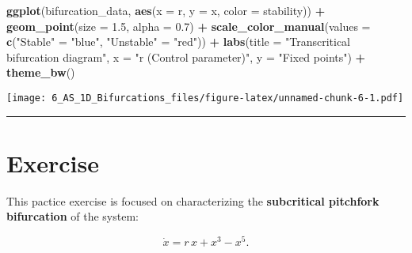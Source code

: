 \documentclass[
]{article}
\newenvironment{Shaded}{\begin{snugshade}}{\end{snugshade}}
\newcommand{\AttributeTok}[1]{\textcolor[rgb]{0.13,0.29,0.53}{#1}}
\newcommand{\FloatTok}[1]{\textcolor[rgb]{0.00,0.00,0.81}{#1}}
\newcommand{\FunctionTok}[1]{\textcolor[rgb]{0.13,0.29,0.53}{\textbf{#1}}}
\newcommand{\NormalTok}[1]{#1}
\newcommand{\OtherTok}[1]{\textcolor[rgb]{0.56,0.35,0.01}{#1}}
\newcommand{\SpecialCharTok}[1]{\textcolor[rgb]{0.81,0.36,0.00}{\textbf{#1}}}
\newcommand{\StringTok}[1]{\textcolor[rgb]{0.31,0.60,0.02}{#1}}
\begin{document}
\begin{Shaded}
\begin{Highlighting}[]
\FunctionTok{ggplot}\NormalTok{(bifurcation\_data, }\FunctionTok{aes}\NormalTok{(}\AttributeTok{x =}\NormalTok{ r, }\AttributeTok{y =}\NormalTok{ x, }\AttributeTok{color =}\NormalTok{ stability)) }\SpecialCharTok{+}
  \FunctionTok{geom\_point}\NormalTok{(}\AttributeTok{size =} \FloatTok{1.5}\NormalTok{, }\AttributeTok{alpha =} \FloatTok{0.7}\NormalTok{) }\SpecialCharTok{+}
  \FunctionTok{scale\_color\_manual}\NormalTok{(}\AttributeTok{values =} \FunctionTok{c}\NormalTok{(}\StringTok{"Stable"} \OtherTok{=} \StringTok{"blue"}\NormalTok{, }\StringTok{"Unstable"} \OtherTok{=} \StringTok{"red"}\NormalTok{)) }\SpecialCharTok{+}
  \FunctionTok{labs}\NormalTok{(}\AttributeTok{title =} \StringTok{"Transcritical bifurcation diagram"}\NormalTok{, }
       \AttributeTok{x =} \StringTok{"r (Control parameter)"}\NormalTok{, }\AttributeTok{y =} \StringTok{"Fixed points"}\NormalTok{) }\SpecialCharTok{+}
  \FunctionTok{theme\_bw}\NormalTok{()}
\end{Highlighting}
\end{Shaded}

\texttt{[image: 6\_AS\_1D\_Bifurcations\_files/figure-latex/unnamed-chunk-6-1.pdf]}

\begin{center}\rule{0.5\linewidth}{0.5pt}\end{center}

\section{Exercise}\label{exercise}

This pactice exercise is focused on characterizing the
\textbf{subcritical pitchfork bifurcation} of the system:

\[
\dot{x} = r\,x + x^3 - x^5.
\]
\end{document}
